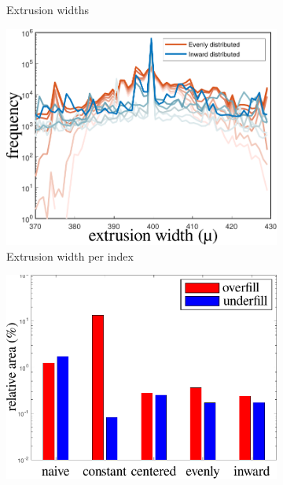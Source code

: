 \begin{figure}
\begin{subfigure}{\figwidth}
\caption{Extrusion widths}
\label{widthHistogram}
\end{subfigure}
\begin{subfigure}{\figwidth}\centering
\includegraphics[height=\figheight]{sources/validation/indexedwidths2.pdf}
\caption{Extrusion width per index}
\label{widthIndexedHistogram}
\end{subfigure}
\begin{subfigure}{\figwidth}\centering
\includegraphics[height=\figheight]{sources/validation/overunderfill.pdf}

\end{subfigure}
\end{figure}
